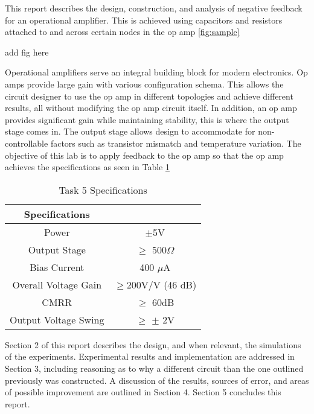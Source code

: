 



	
This report describes the design, construction, and analysis of negative feedback for an operational amplifier. This is achieved using capacitors and resistors attached to and across certain nodes in the op amp \ref{fig:sample}


add fig here	
	
	
	
	
Operational amplifiers serve an integral building block for modern electronics. Op amps provide large gain with various configuration schema. This allows the circuit designer to use the op amp in different topologies and achieve different results, all without modifying the op amp circuit itself. In addition, an op amp provides significant gain while maintaining stability, this is where the output stage comes in. The output stage allows design to accommodate for non-controllable factors such as transistor mismatch and temperature variation.   The objective of this lab is to apply feedback to the op amp so that the op amp achieves the specifications as seen in Table \ref{tab:labspecs}

\begin{table}[H]
	\centering
	\caption{Task 5 Specifications}
	\label{tab:labspecs}
	\begin{tabular}{|c|c|}
			\hline
			\textbf{Specifications} &                 \\ \hline
			Power                   & $\pm$5V         \\ \hline
			Output Stage 			& $\geq$ 500$\Omega$ \\ \hline
			Bias Current            & 400 $\mu$A      \\ \hline
			Overall Voltage Gain    & $\geq$200V/V (46 dB)  \\ \hline
			CMRR                    & $\geq$ 60dB     \\ \hline
			Output Voltage Swing    & $\geq$ $\pm$ 2V \\ \hline
		\end{tabular}
\end{table}

\noindent Section 2 of this report describes the design, and when relevant, the simulations of the experiments. Experimental results and implementation are addressed in Section 3, including reasoning as to why a different circuit than the one outlined previously was constructed. A discussion of the results, sources of error, and areas of possible improvement are outlined in Section 4. Section 5 concludes this report. \newline


